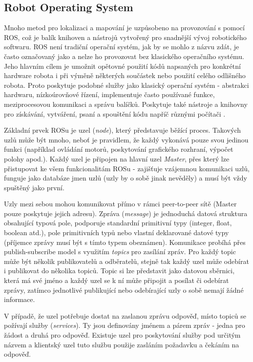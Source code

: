 \documentclass[12pt,a4paper]{article}
\begin{document}
\subsection{Robot Operating System}
Mnoho metod pro lokalizaci a mapování je uzpůsobeno na provozování s pomocí ROS, což je balík knihoven a nástrojů vytvořený pro snadnější vývoj robotického softwaru. ROS není tradiční operační systém, jak by se mohlo z názvu zdát, je často označovaný jako  a nelze ho provozovat bez klasického operačního systému. Jeho hlavním cílem je umožnit opětovné použití kódů napsaných pro konkrétní hardware robota i při výměně některých součástek nebo použití celého odlišného robota. Proto poskytuje podobné služby jako klasický operační systém - abstrakci hardwaru, nízkoúrovňové řízení, implementuje často používané funkce, meziprocesovou komunikaci a správu balíčků. Poskytuje také nástroje a knihovny pro získávání, vytváření, psaní a spouštění kódu napříč různými počítači \cite{ROS}.

Základní prvek ROSu je uzel (\textit{node}), který představuje běžící proces. Takových uzlů může být mnoho, neboť je pravidlem, že každý vykonává pouze svou jedinou funkci (například ovládání motorů, poskytování grafického rozhraní, výpočet polohy apod.). Každý uzel je připojen na hlavní uzel \textit{Master}, přes který lze přistupovat ke všem funkcionalitám ROSu - zajišťuje vzájemnou komunikaci uzlů, funguje jako databáze jmen uzlů (uzly by o sobě jinak nevěděly) a musí být vždy spuštěný jako první. 

Uzly mezi sebou mohou komunikovat přímo v rámci peer-to-peer sítě (Master pouze poskytuje jejich adresu). Zpráva (\textit{message}) je jednoduchá datová struktura obsahující typová pole, podporuje standardní primitivní typy (integer, float, boolean atd.), pole primitivních typů nebo vlastní deklarované datové typy (příjemce zprávy musí být s tímto typem obeznámen). Komunikace probíhá přes publish-subscribe model s využitím \textit{topics} pro zasílání zpráv. Pro každý topic může být několik publikovatelů a odběratelů, stejně tak každý uzel může odebírat i publikovat do několika topiců. Topic si lze představit jako datovou sběrnici, která má své jméno a každý uzel se k ní může připojit a posílat či odebírat zprávy, zatímco jednotlivé publikující nebo odebírající uzly o sobě nemají žádné informace. 

V případě, že uzel potřebuje dostat na zaslanou zprávu odpověď, místo topiců se požívají služby (\textit{services}). Ty jsou definovány jménem a párem zpráv - jedna pro žádost a druhá pro odpověď. Existuje uzel pro poskytování služby pod určitým názvem a klientský uzel tuto službu použije zasláním požadavku a čekáním na odpověď.
\end{document}
